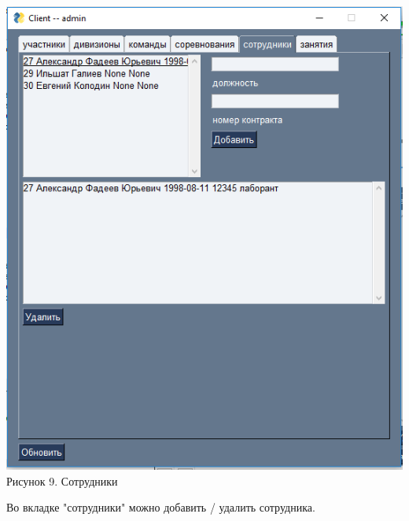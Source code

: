 \documentclass[a4paper,12pt,preview]{report} %
\begin{document}
	
	\begin{center}
		\includegraphics{workers.PNG} \\
		Рисунок 9. Сотрудники
	\end{center}
	
	Во вкладке "сотрудники" можно добавить / удалить сотрудника.
	
	
	
\end{document}
